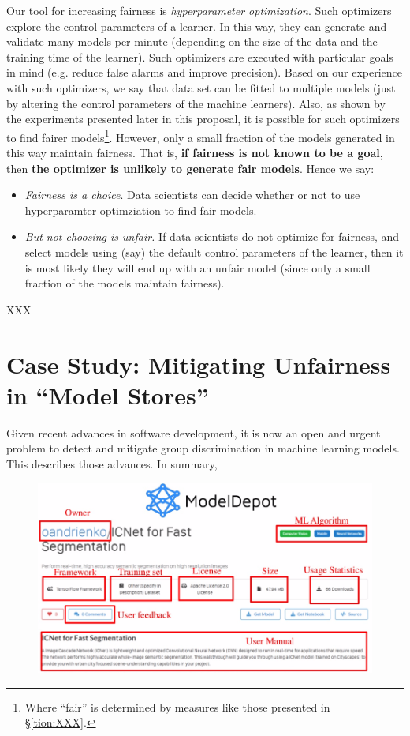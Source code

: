 \documentclass{NSF}
\newenvironment{myitemize}
{ \begin{itemize}
    \setlength{\itemsep}{0pt}
    \setlength{\parskip}{0pt}
    \setlength{\parsep}{0pt}     }
{ \end{itemize}                  }
\newcommand{\bi}{\begin{myitemize}}
\newcommand{\ei}{\end{myitemize}}
\newcommand{\tion}[1]{\S\ref{tion:#1}}
\begin{document}
\begin{nsfdescription}
Our tool for increasing fairness is {\em hyperparameter optimization}. 
Such optimizers explore the control parameters of a learner. In this way, they can generate and validate
many models per minute (depending on the size of the data and
the training time of the learner). Such optimizers
are executed with particular goals in mind (e.g. reduce false alarms and improve precision). 
Based on our experience with such optimizers, we say that  data set can be fitted to multiple models (just by altering the control parameters of the machine learners).
Also, as shown by the experiments presented later in this proposal, it is possible for such optimizers
to find fairer models\footnote{Where ``fair'' is determined by measures like those
presented in \tion{XXX}.}.
However, only a small fraction of the models generated in this way maintain fairness.
That is, 
{\bf if fairness is not known to be a goal}, then {\bf the optimizer is unlikely to generate fair models}.
Hence we say:
\bi
\item {\em Fairness is a choice}. Data scientists
can decide whether or not to use   hyperparamter optimziation
to find fair models.
\item {\em But not choosing is unfair.}
If data scientists do not optimize for fairness,
and select models using (say) the default control
parameters of the learner, then it is most
likely they will end up with an unfair model
(since only a small fraction of the models maintain
fairness).
\ei
XXX

\section{Case Study: Mitigating Unfairness in ``Model Stores''}
Given recent advances in software development,
it is now an open and 
urgent problem to detect and mitigate
  group discrimination in machine learning models.
  This describes those advances. In summary,
  
  \begin{figure}
 \centering \includegraphics[width=5in]{fig/store.png}
 

\end{figure}
\end{nsfdescription}
\end{document}
